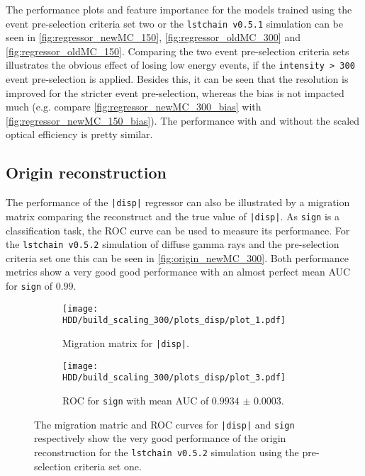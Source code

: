 The performance plots and feature importance for the models trained using the event pre-selection criteria set two or the \texttt{lstchain v0.5.1} simulation 
can be seen in \autoref{fig:regressor_newMC_150}, \autoref{fig:regressor_oldMC_300} and \autoref{fig:regressor_oldMC_150}.
Comparing the two event pre-selection criteria sets illustrates the obvious effect of losing low energy events, if the \texttt{intensity > 300} event pre-selection is applied.
Besides this, it can be seen that the resolution is improved for the stricter event pre-selection, whereas the bias is not impacted much 
(e.g. compare \autoref{fig:regressor_newMC_300_bias} with \autoref{fig:regressor_newMC_150_bias}).
The performance with and without the scaled optical efficiency is pretty similar.


\subsection{Origin reconstruction}
The performance of the \texttt{|disp|} regressor can also be illustrated by a migration matrix comparing the reconstruct and the true value of \texttt{|disp|}.
As \texttt{sign} is a classification task, the ROC curve can be used to measure its performance.
For the \texttt{lstchain v0.5.2} simulation of diffuse gamma rays and the pre-selection criteria set one this can be seen in \autoref{fig:origin_newMC_300}.
Both performance metrics show a very good good performance with an almost perfect mean AUC for \texttt{sign} of $\num{0.99}$.
\begin{figure}
    \centering
    \begin{subfigure}{0.49\textwidth}
        \centering
        \texttt{[image: HDD/build\_scaling\_300/plots\_disp/plot\_1.pdf]}
        \caption{Migration matrix for \texttt{|disp|}.}
    \end{subfigure}
    \hfill
    \begin{subfigure}{0.49\textwidth}
        \centering
        \texttt{[image: HDD/build\_scaling\_300/plots\_disp/plot\_3.pdf]}
        \caption{ROC for \texttt{sign} with mean AUC of $\num{0.9934(3)}$.}    
        \label{fig:origin_newMC_300_roc}  
    \end{subfigure}
    \caption{The migration matric and ROC curves for \texttt{|disp|} and \texttt{sign} respectively show the very good performance of the origin reconstruction
        for the \texttt{lstchain v0.5.2} simulation using the pre-selection criteria set one.
    }
    \label{fig:origin_newMC_300}
\end{figure}

